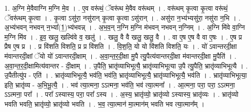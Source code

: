 \documentclass[17pt]{extarticle}
\begin{document}
1. अ॒ग्नि मे॒वैवाग्नि म॒ग्नि मे॒व । . ए॒व वरू॑थं॒ ॅवरू॑थ मे॒वैव वरू॑थम् । . वरू॑थम् कृ॒त्वा कृ॒त्वा वरू॑थं॒ ॅवरू॑थम् कृ॒त्वा । . कृ॒त्वा ऽसु॑रा॒ नसु॑रान् कृ॒त्वा कृ॒त्वा ऽसु॑रान् । . असु॑रा न॒भ्य॑भ्यसु॑रा॒ नसु॑रा न॒भि । . अ॒भ्य॑भवन् नभवन् न॒भ्या᳚(1॒)भ्य॑भवन्न् । . अ॒भ॒व॒न् न॒ग्नि म॒ग्नि म॑भवन् नभवन् न॒ग्निम् । . अ॒ग्नि मि॑वे वा॒ग्नि म॒ग्नि मि॑व । . इ॒व॒ खलु॒ खल्वि॑वे व॒ खलु॑ । . खलु॒ वै वै खलु॒ खलु॒ वै । . वा ए॒ष ए॒ष वै वा ए॒षः । . ए॒ष प्र प्रैष ए॒ष प्र । . प्र वि॑शति विशति॒ प्र प्र वि॑शति । . वि॒श॒ति॒ यो यो वि॑शति विशति॒ यः । . यो॑ ऽवान्तरदी॒क्षा म॑वान्तरदी॒क्षां ॅयो यो॑ ऽवान्तरदी॒क्षाम् । . अ॒वा॒न्त॒र॒दी॒क्षा मु॒पै त्यु॒पैत्य॑वान्तरदी॒क्षा म॑वान्तरदी॒क्षा मु॒पैति॑ । . अ॒वा॒न्त॒र॒दी॒क्षामित्य॑वान्तर - दी॒क्षाम् । . उ॒पैति॒ भ्रातृ॑व्याभिभूत्यै॒ भ्रातृ॑व्याभिभूत्या उ॒पै त्यु॒पैति॒ भ्रातृ॑व्याभिभूत्यै । . उ॒पैतीत्यु॑प - एति॑ । . भ्रातृ॑व्याभिभूत्यै॒ भव॑ति॒ भव॑ति॒ भ्रातृ॑व्याभिभूत्यै॒ भ्रातृ॑व्याभिभूत्यै॒ भव॑ति । . भ्रातृ॑व्याभिभूत्या॒ इति॒ भ्रातृ॑व्य - अ॒भि॒भू॒त्यै॒ । . भव॑ त्या॒त्मना॒ ऽऽत्मना॒ भव॑ति॒ भव॑ त्या॒त्मना᳚ । . आ॒त्मना॒ परा॒ परा॒ ऽऽत्मना॒ ऽऽत्मना॒ परा᳚ । . परा᳚ ऽस्यास्य॒ परा॒ परा᳚ ऽस्य । . अ॒स्य॒ भ्रातृ॑व्यो॒ भ्रातृ॑व्यो ऽस्यास्य॒ भ्रातृ॑व्यः । . भ्रातृ॑व्यो भवति भवति॒ भ्रातृ॑व्यो॒ भ्रातृ॑व्यो भवति । . भ॒व॒ त्या॒त्मान॑ मा॒त्मान॑म् भवति भव त्या॒त्मान᳚म् । \newline
\end{document}

